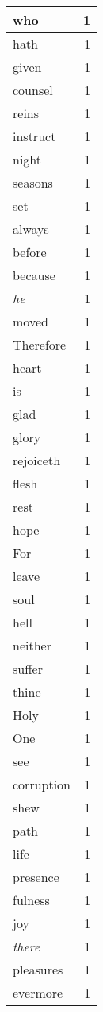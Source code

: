\begin{center}
\begin{longtable}{l|r}
who & 1 \\ \hline
hath & 1 \\ \hline
given & 1 \\ \hline
counsel & 1 \\ \hline
reins & 1 \\ \hline
instruct & 1 \\ \hline
night & 1 \\ \hline
seasons & 1 \\ \hline
set & 1 \\ \hline
always & 1 \\ \hline
before & 1 \\ \hline
because & 1 \\ \hline
\emph{he} & 1 \\ \hline
moved & 1 \\ \hline
Therefore & 1 \\ \hline
heart & 1 \\ \hline
is & 1 \\ \hline
glad & 1 \\ \hline
glory & 1 \\ \hline
rejoiceth & 1 \\ \hline
flesh & 1 \\ \hline
rest & 1 \\ \hline
hope & 1 \\ \hline
For & 1 \\ \hline
leave & 1 \\ \hline
soul & 1 \\ \hline
hell & 1 \\ \hline
neither & 1 \\ \hline
suffer & 1 \\ \hline
thine & 1 \\ \hline
Holy & 1 \\ \hline
One & 1 \\ \hline
see & 1 \\ \hline
corruption & 1 \\ \hline
shew & 1 \\ \hline
path & 1 \\ \hline
life & 1 \\ \hline
presence & 1 \\ \hline
fulness & 1 \\ \hline
joy & 1 \\ \hline
\emph{there} & 1 \\ \hline
pleasures & 1 \\ \hline
evermore & 1 \\ \hline
\end{longtable}
\end{center}



